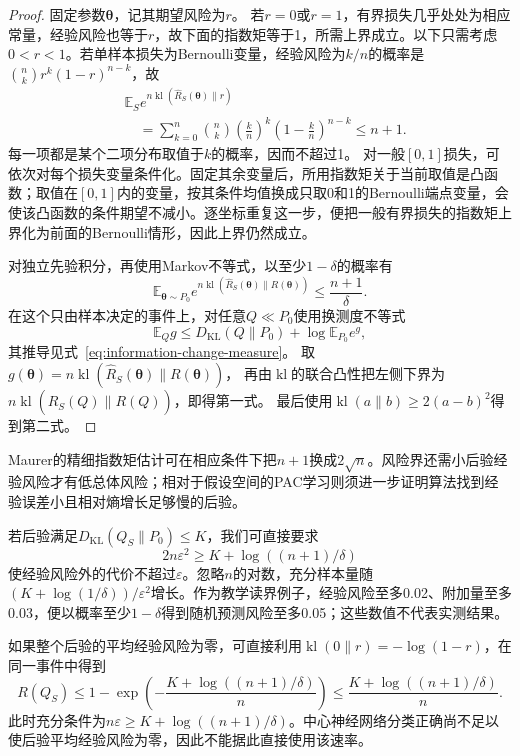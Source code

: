 \begin{proof}
固定参数$\bm\theta$，记其期望风险为$r$。
若$r=0$或$r=1$，有界损失几乎处处为相应常量，经验风险也等于$r$，故下面的指数矩等于1，所需上界成立。以下只需考虑$0<r<1$。若单样本损失为Bernoulli变量，经验风险为$k/n$的概率是
$\binom nk r^k(1-r)^{n-k}$，故
\[
 \begin{aligned}
 &\mathbb E_S e^{n\operatorname{kl}(\hat R_S(\bm\theta)\|r)}\\
 &\quad=\sum_{k=0}^n\binom nk
       \left(\frac kn\right)^k\left(1-\frac kn\right)^{n-k}
 \leq n+1.
 \end{aligned}
\]
每一项都是某个二项分布取值于$k$的概率，因而不超过1。
对一般$[0,1]$损失，可依次对每个损失变量条件化。固定其余变量后，所用指数矩关于当前取值是凸函数；取值在$[0,1]$内的变量，按其条件均值换成只取0和1的Bernoulli端点变量，会使该凸函数的条件期望不减小。逐坐标重复这一步，便把一般有界损失的指数矩上界化为前面的Bernoulli情形，因此上界仍然成立。

对独立先验积分，再使用Markov不等式，以至少$1-\delta$的概率有
\[
 \mathbb E_{\bm\theta\sim P_0}
 e^{n\operatorname{kl}(\hat R_S(\bm\theta)\|R(\bm\theta))}
 \leq\frac{n+1}{\delta}.
\]
在这个只由样本决定的事件上，对任意$Q\ll P_0$使用换测度不等式
\begin{equation}
 \mathbb E_Q g\leq D_{\mathrm{KL}}(Q\|P_0)+\log\mathbb E_{P_0}e^g,
 \label{eq:change-of-measure}
\end{equation}
其推导见式~\eqref{eq:information-change-measure}。
取$g(\bm\theta)=n\operatorname{kl}(\hat R_S(\bm\theta)\|R(\bm\theta))$，
再由$\operatorname{kl}$的联合凸性把左侧下界为
$n\operatorname{kl}(\hat R_S(Q)\|R(Q))$，即得第一式。
最后使用$\operatorname{kl}(a\|b)\geq2(a-b)^2$得到第二式。
\end{proof}

Maurer的精细指数矩估计可在相应条件下把$n+1$换成$2\sqrt n$。风险界还需小后验经验风险才有低总体风险；相对于假设空间的PAC学习则须进一步证明算法找到经验误差小且相对熵增长足够慢的后验。

若后验满足$D_{\mathrm{KL}}(Q_S\|P_0)\leq K$，我们可直接要求
\begin{equation}
 2n\varepsilon^2\geq K+\log((n+1)/\delta)
 \label{eq:pac-bayes-sample-requirement}
\end{equation}
使经验风险外的代价不超过$\varepsilon$。忽略$n$的对数，充分样本量随$(K+\log(1/\delta))/\varepsilon^2$增长。作为教学读界例子，经验风险至多0.02、附加量至多0.03，便以概率至少$1-\delta$得到随机预测风险至多0.05；这些数值不代表实测结果。

如果整个后验的平均经验风险为零，可直接利用$\operatorname{kl}(0\|r)=-\log(1-r)$，在同一事件中得到
\[
 R(Q_S)\leq1-\exp\left(-\frac{K+\log((n+1)/\delta)}n\right)
 \leq\frac{K+\log((n+1)/\delta)}n.
\]
此时充分条件为$n\varepsilon\geq K+\log((n+1)/\delta)$。中心神经网络分类正确尚不足以使后验平均经验风险为零，因此不能据此直接使用该速率。

